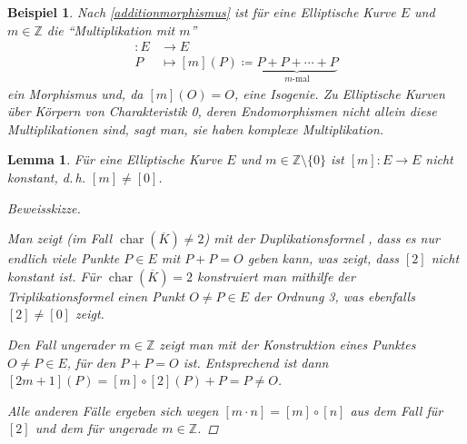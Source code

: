 \documentclass[english, german, parskip=half]{scrartcl}
\newtheorem{Lemma}[Satz]{Lemma}
\newtheorem{Beispiel}[Satz]{Beispiel}
\theoremstyle{definition}
\theoremstyle{remark}
\newcommand*{\Z}{\mathds{Z}}
\newcommand*{\algK}{\ensuremath{\overline K}} %
\newcommand*{\longto}{\longrightarrow}
\DeclareMathOperator{\Char}{char} %
\begin{document}
\begin{Beispiel}
  Nach \autoref{additionmorphismus} ist für eine Elliptische Kurve $E$
  und $m\in\Z$ die \enquote{Multiplikation mit $m$}
  \begin{align*}
    [m]\colon E &\longto E\\
    P&\longmapsto [m](P) \coloneqq
       \underbrace{P+P+\dotsb+P}_{m\text{-mal}}
  \end{align*}
  ein Morphismus und, da $[m](O)=O$, eine Isogenie.
  Zu Elliptische Kurven über Körpern von Charakteristik 0, deren
  Endomorphismen nicht allein diese Multiplikationen sind, sagt man,
  sie haben komplexe Multiplikation.
\end{Beispiel}

\begin{Lemma}\label{additionnichtkonstant}
  Für eine Elliptische Kurve $E$ und $m\in\Z\setminus\{0\}$
  ist $[m]\colon E\to E$ nicht konstant, d.\,h. $[m]\neq[0]$.
  \begin{proof}[Beweisskizze]
    \cite[siehe][Proposition 4.2 (a)]{silverman}
    
    Man zeigt (im Fall $\Char(\algK)\neq2$) mit der Duplikationsformel
    \cite[Group Law Algorithm III.2.3(d)]{silverman},
    dass es nur endlich viele Punkte $P\in E$ mit $P+P=O$ geben kann,
    was zeigt, dass $[2]$ nicht konstant ist.
    Für $\Char(\algK)=2$ konstruiert man mithilfe der
    Triplikationsformel \cite[Exercise III.3.2]{silverman}
    einen Punkt $O\neq P\in E$ der Ordnung 3, was
    ebenfalls $[2]\neq[0]$ zeigt.

    Den Fall ungerader $m\in\Z$ zeigt man mit der Konstruktion eines 
    Punktes $O\neq P\in E$, für den $P+P=O$ ist. Entsprechend ist dann
    $[2m+1](P)=[m]\circ[2](P)+P=P\neq O$.
    
    Alle anderen Fälle ergeben sich wegen 
    $[m\cdot n]=[m]\circ[n]$ aus dem Fall für $[2]$ und dem für ungerade
    $m\in\Z$.
  \end{proof}
\end{Lemma}
\end{document}
